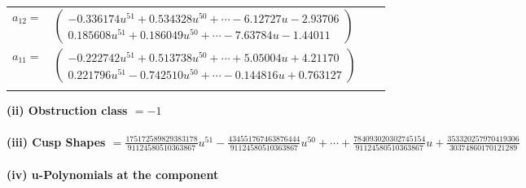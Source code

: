 \documentclass[1p]{elsarticle_modified}
\theoremstyle{definition}
\begin{document}
\begin{tabular}{m{7pt} m{180pt} m{7pt} m{180pt} }
\flushright $a_{12}=$&$\begin{pmatrix}-0.336174 u^{51}+0.534328 u^{50}+\cdots-6.12727 u-2.93706\\0.185608 u^{51}+0.186049 u^{50}+\cdots-7.63784 u-1.44011\end{pmatrix}$ \\
\flushright $a_{11}=$&$\begin{pmatrix}-0.222742 u^{51}+0.513738 u^{50}+\cdots+5.05004 u+4.21170\\0.221796 u^{51}-0.742510 u^{50}+\cdots-0.144816 u+0.763127\end{pmatrix}$\\&\end{tabular}
\flushleft \textbf{(ii) Obstruction class $= -1$}\\~\\
\flushleft \textbf{(iii) Cusp Shapes $= \frac{175172589829383178}{91124580510363867} u^{51}-\frac{434551767463876444}{91124580510363867} u^{50}+\cdots+\frac{784093020302745154}{91124580510363867} u+\frac{353320257970419306}{30374860170121289}$}\\~\\
\newpage\renewcommand{\arraystretch}{1}
\flushleft \textbf{(iv) u-Polynomials at the component}\newline \\
\end{document}
